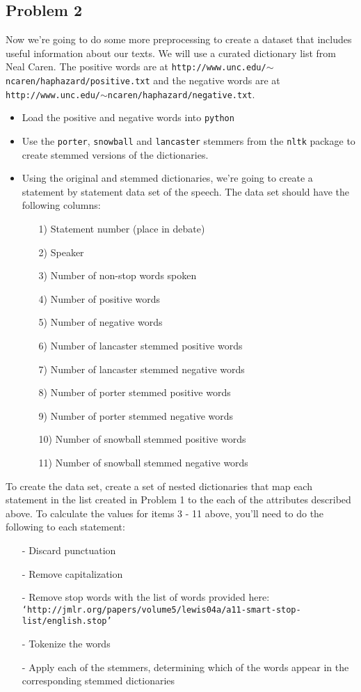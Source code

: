 \documentclass[12pt,letterpaper]{article}
\begin{document}
\subsection*{Problem 2}
Now we're going to do some more preprocessing to create a dataset that includes useful information about our texts. We will use a curated dictionary list from Neal Caren. The positive words are at {\tt http://www.unc.edu/$\sim$ncaren/haphazard/positive.txt} and the negative words are at {\tt http://www.unc.edu/$\sim$ncaren/haphazard/negative.txt}.
\begin{itemize}
\item Load the positive and negative words into {\tt python}

\item Use the {\tt porter}, {\tt snowball} and {\tt lancaster} stemmers from the {\tt nltk} package to create stemmed versions of the dictionaries.


\item Using the original and stemmed dictionaries, we're going to create a statement by statement data set of the speech.
The data set should have the following columns:
\begin{itemize}
\item[1)] Statement number (place in debate)
\item[2)] Speaker
\item[3)] Number of non-stop words spoken
\item[4)] Number of positive words
\item[5)] Number of negative words
\item[6)] Number of lancaster stemmed positive words
\item[7)] Number of lancaster stemmed negative words
\item[8)] Number of porter stemmed positive words
\item[9)] Number of porter stemmed negative words
\item[10)] Number of snowball stemmed positive words
\item[11)] Number of snowball stemmed negative words
\end{itemize}
\end{itemize}

To create the data set, create a set of nested dictionaries that map each statement in the list created in Problem 1 to the each of the attributes described above. To  calculate the values for items 3 - 11 above, you'll need to do the following to each statement:
\begin{itemize}
\item[-] Discard punctuation
\item[-] Remove capitalization
\item[-] Remove stop words with the list of words provided here: \\
{\tt `http://jmlr.org/papers/volume5/lewis04a/a11-smart-stop-list/english.stop'}
\item[-] Tokenize the words
\item[-] Apply each of the stemmers, determining which of the words appear in the corresponding stemmed dictionaries
\end{itemize}
\end{document}
